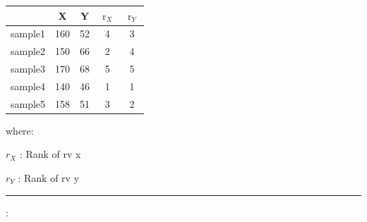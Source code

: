 \documentclass[	DIV=calc,%
paper=a4,%
fontsize=11pt,%
twocolumn]{scrartcl} %
\newcommand{\hformbar}[1]{\vspace{5pt}\hrule\vspace{10pt}} %
\newcommand{\formdesc}[1]{\noindent\textbf{#1}}
\begin{document}
\begin{itemize}
\begin{center}
	\begin{tabular}{ |c|c|c|c|c| } 
		\hline
		  & X & Y & $\operatorname{r}_X$ & $\operatorname{r}_Y$ \\
		  \hline
		sample1 & 160 & 52 & 4 & 3 \\ 
		sample2 & 150 & 66 & 2 & 4 \\
		sample3 & 170 & 68 & 5 & 5 \\
		sample4 & 140 & 46 & 1 & 1 \\
	    sample5 & 158 & 51 & 3 & 2 \\   
		\hline
	\end{tabular}
\end{center}


where:

${r} _{X}$ : Rank of rv x

${r} _{Y}$ :  Rank of rv y

\end{itemize}


\hformbar

\formdesc{Confidence Interval}:
\end{document}
